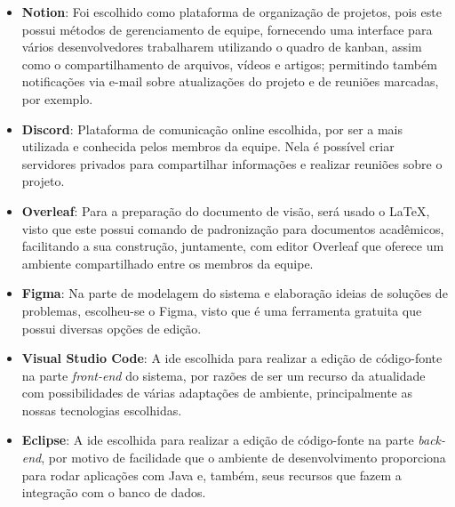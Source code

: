\begin{itemize}
\item \textbf{Notion}: Foi escolhido como plataforma de organização de projetos, pois este possui métodos de gerenciamento de equipe, fornecendo uma interface para vários desenvolvedores trabalharem utilizando o quadro de kanban, assim como o compartilhamento de arquivos, vídeos e artigos; permitindo também notificações via e-mail sobre atualizações do projeto e de reuniões marcadas, por exemplo. 
    
\item \textbf{Discord}: Plataforma de comunicação online escolhida, por ser a mais utilizada e conhecida pelos membros da equipe. Nela é possível criar servidores privados para compartilhar informações e realizar reuniões sobre o projeto.
    
\item \textbf{Overleaf}: Para a preparação do documento de visão, será usado o \LaTeX, visto que este possui comando de padronização para documentos acadêmicos, facilitando a sua construção, juntamente, com editor Overleaf que oferece um ambiente compartilhado entre os membros da equipe. 
    
\item \textbf{Figma}: Na parte de modelagem do sistema e elaboração ideias de soluções de problemas, escolheu-se o Figma, visto que é uma ferramenta gratuita que possui diversas opções de edição.
    
\item \textbf{Visual Studio Code}: A \acs{ide} escolhida para realizar a edição de código-fonte na parte \textsl{\gls{front-end}} do sistema, por razões de ser um recurso da atualidade com possibilidades de várias adaptações de ambiente, principalmente as nossas tecnologias escolhidas.

\item \textbf{Eclipse}: A \acs{ide} escolhida para realizar a edição de código-fonte na parte \textsl{\gls{back-end}}, por motivo de facilidade que o ambiente de desenvolvimento proporciona para rodar aplicações com Java e, também, seus recursos que fazem a integração com o banco de dados.
\end{itemize}


